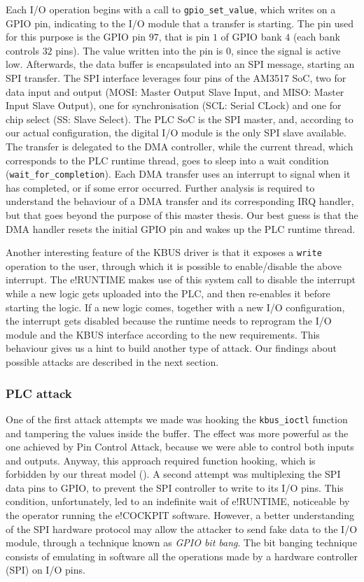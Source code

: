 Each I/O operation begins with a call to \verb|gpio_set_value|, which writes on a GPIO pin, indicating to the I/O module that a transfer is starting.
The pin used for this purpose is the GPIO pin $97$, that is pin $1$ of GPIO bank $4$ (each bank controls $32$ pins). The value written into the pin is $0$,
since the signal is active low. Afterwards, the data buffer is encapsulated into an SPI message, starting an SPI transfer.
The SPI interface leverages four pins of the AM3517 SoC, two for data input and output (MOSI: Master Output Slave Input, and MISO: Master Input Slave Output),
one for synchronisation (SCL: Serial CLock) and one for chip select (SS: Slave Select).
The PLC SoC is the SPI master, and, according to our actual configuration, the digital I/O module is the only SPI slave available.
The transfer is delegated to the DMA controller, while the current thread, which corresponds to the PLC runtime thread,
goes to sleep into a wait condition (\verb|wait_for_completion|). Each DMA transfer uses an interrupt to signal when it has completed, or if some error occurred.
Further analysis is required to understand the behaviour of a DMA transfer and its corresponding IRQ handler, but that goes beyond the purpose of this master thesis.
Our best guess is that the DMA handler resets the initial GPIO pin and wakes up the PLC runtime thread.

Another interesting feature of the KBUS driver is that it exposes a \verb|write| operation to the user, through which it is possible to enable/disable the above interrupt.
The e!RUNTIME makes use of this system call to disable the interrupt while a new logic gets uploaded into the PLC, and then re-enables it before starting the logic.
If a new logic comes, together with a new I/O configuration, the interrupt gets disabled because the runtime needs to reprogram the I/O module
and the KBUS interface according to the new requirements. This behaviour gives us a hint to build another type of attack.
Our findings about possible attacks are described in the next section.


\subsubsection{PLC attack}

One of the first attack attempts we made was hooking the \verb|kbus_ioctl| function and tampering the values
inside the buffer. The effect was more powerful as the one achieved by Pin Control Attack, because we were able to control both inputs and outputs.
Anyway, this approach required function hooking, which is forbidden by our threat model ().
A second attempt was multiplexing the SPI data pins to GPIO, to prevent the SPI controller to write to its I/O pins.
This condition, unfortunately, led to an indefinite wait of e!RUNTIME, noticeable by the operator running the e!COCKPIT software.
However, a better understanding of the SPI hardware protocol may allow the attacker to send fake data to the I/O module,
through a technique known as \emph{GPIO bit bang}. The bit banging technique consists of emulating in software all the operations made by
a hardware controller (\eg SPI) on I/O pins.


